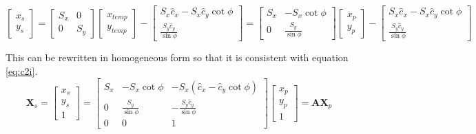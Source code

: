 \documentclass[12pt,oneside,openany,a4paper, %
english, %
masters-t, goldenblock]{usthesis}
\begin{document}
\begin{equation}
  \begin{bmatrix}
  x_s \\
  y_s
  \end{bmatrix} = 
  \begin{bmatrix}
  S_x & 0\\
  0 & S_y
  \end{bmatrix}
  \begin{bmatrix}
  x_{temp}\\
  y_{temp}
  \end{bmatrix} -
  \begin{bmatrix}
  S_x \hat c_x - S_x \hat c_y \cot \phi \\
  \frac{S_y \hat c_y}{\sin \phi}
  \end{bmatrix}=
  \begin{bmatrix}
  S_x & -S_x \cot \phi \\
  0 & \frac{S_y}{\sin \phi}
  \end{bmatrix}
  \begin{bmatrix}
  x_p \\
  y_p
  \end{bmatrix} -
  \begin{bmatrix}
  S_x \hat c_x - S_x \hat c_y \cot \phi \\
  \frac{S_y \hat c_y}{\sin \phi}
  \end{bmatrix}
\end{equation}

This can be rewritten in homogeneous form so that it is consistent with equation \ref{eq:c2i}.
\begin{equation}
\label{eq: image2sensor}
  \bm{X}_s = 
  \begin{bmatrix}
  x_s \\
  y_s \\
  1
  \end{bmatrix} =
  \begin{bmatrix}
  S_x & -S_x \cot \phi & -S_x \left( \hat c_x - \hat c_y \cot \phi \right) \\
  0 & \frac{S_y}{\sin \phi} & -\frac{S_y \hat c_y}{\sin \phi} \\
  0 & 0 & 1
  \end{bmatrix}
  \begin{bmatrix}
  x_p \\
  y_p \\
  1
  \end{bmatrix} =
  \bm{A} \bm{X}_p
\end{equation}
\end{document}
